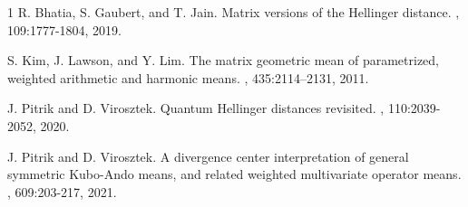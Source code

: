 \documentclass[a4paper]{amsart}
\begin{document}
\begin{thebibliography}{1}
R. Bhatia, S. Gaubert, and T. Jain.
\newblock Matrix versions of the Hellinger distance.
, 109:1777-1804, 2019.

S. Kim, J. Lawson, and Y. Lim. 
\newblock The matrix geometric mean of parametrized, weighted arithmetic and harmonic means.
, 435:2114--2131, 2011.

J. Pitrik and D. Virosztek.
\newblock Quantum Hellinger distances revisited.
, 110:2039-2052, 2020.

J. Pitrik and D. Virosztek.
\newblock A divergence center interpretation of general symmetric Kubo-Ando means, and related weighted multivariate operator means.
, 609:203-217, 2021.

\end{thebibliography}
\end{document}

